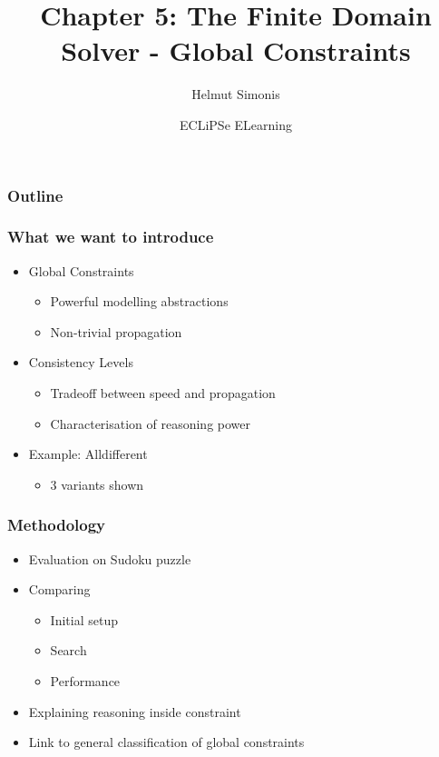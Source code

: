 \documentclass{beamer}
\title[Global Constraints] %
{Chapter 5: The Finite Domain Solver - Global Constraints}
\subtitle
{} %
\author %
{Helmut Simonis}
\institute[4C] %
{Cork Constraint Computation Centre\\Computer Science Department\\University College Cork\\Ireland}
\date[\today] %
{ECLiPSe ELearning}
\begin{document}

\begin{frame}
  \titlepage
\end{frame}

\begin{frame}
\frametitle{Outline}
  \tableofcontents[hideallsubsections]
\end{frame}




\begin{frame}
\frametitle{What we want to introduce}
\begin{itemize}
\item Global Constraints
\begin{itemize}
\item Powerful modelling abstractions
\item Non-trivial propagation
\end{itemize}
\item Consistency Levels
\begin{itemize}
\item Tradeoff between speed and propagation
\item Characterisation of reasoning power
\end{itemize}
\item Example: Alldifferent
\begin{itemize}
\item 3 variants shown
\end{itemize}
\end{itemize}
\end{frame}

\begin{frame}
\frametitle{Methodology}
\begin{itemize}
\item Evaluation on Sudoku puzzle
\item Comparing
\begin{itemize}
\item Initial setup
\item Search
\item Performance
\end{itemize}
\item Explaining reasoning inside constraint
\item Link to general classification of global constraints
\end{itemize}
\end{frame}
\end{document}
